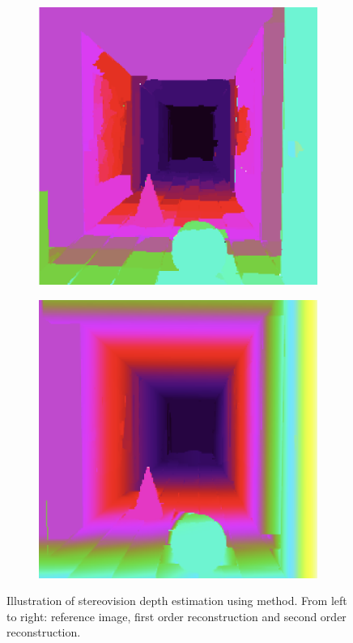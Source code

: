 \begin{figure}[h]
\begin{subfigure}{.3\textwidth}
		\centering
		\includegraphics[width=\linewidth]{Figures/SOA/wood2.png}
	\end{subfigure}
	\begin{subfigure}{.3\textwidth}
		
		\centering
		\includegraphics[width=\linewidth]{Figures/SOA/wood3.png}
	\end{subfigure}
	\caption[Illustration of stereovision depth estimation using Woordfor et al. method.]{Illustration of stereovision depth estimation using \cite{Woodford2008GlobalPriors} method. From left to right: reference image, first order reconstruction and second order reconstruction.}
	\label{illu-wood}
\end{figure}

